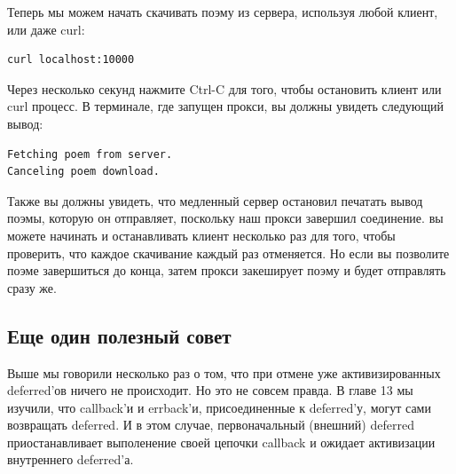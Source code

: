 Теперь мы можем начать скачивать поэму из сервера, используя любой 
клиент, или даже curl:

\begin{scriptsize}\begin{verbatim}
curl localhost:10000
\end{verbatim}\end{scriptsize}

Через несколько секунд нажмите Ctrl-C для того, чтобы остановить 
клиент или curl процесс. В терминале, где запущен прокси, вы должны 
увидеть следующий вывод:

\begin{scriptsize}\begin{verbatim}
Fetching poem from server.
Canceling poem download.
\end{verbatim}\end{scriptsize}


Также вы должны увидеть, что медленный сервер 
остановил печатать вывод поэмы, которую он отправляет, 
поскольку наш прокси завершил соединение. вы можете 
начинать и останавливать клиент несколько раз для того, чтобы 
проверить, что каждое скачивание каждый раз отменяется. Но если 
вы позволите поэме завершиться до конца, затем прокси закеширует 
поэму и будет отправлять сразу же.


\subsection{Еще один полезный совет}


Выше мы говорили несколько раз о том, что при отмене 
уже активизированных deferred'ов ничего не происходит. 
Но это не совсем правда. В главе 13 мы изучили, что 
callback'и и errback'и, присоединенные к deferred'у, 
могут сами возвращать deferred. И в этом случае, первоначальный 
(внешний) deferred приостанавливает выполенение  своей 
цепочки callback и ожидает активизации внутреннего deferred'а.



